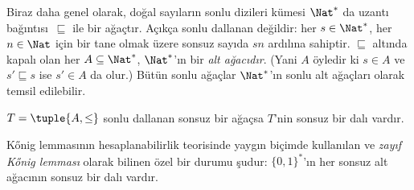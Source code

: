 \begin{ex}
Biraz daha genel olarak, doğal sayıların sonlu dizileri kümesi $\Nat^*$ da
uzantı bağıntısı~$\sqsubseteq$ ile bir ağaçtır. Açıkça sonlu dallanan değildir:
her $s \in \Nat^*$, her $n \in \Nat$ için bir tane olmak üzere sonsuz sayıda
$sn$ ardılına sahiptir. $\sqsubseteq$ altında kapalı olan her
$A \subseteq \Nat^*$, $\Nat^*$'ın bir \emph{alt ağacıdır}. (Yani $A$ öyledir
ki $s \in A$ ve $s' \sqsubseteq s$ ise $s' \in A$ da olur.) Bütün sonlu
ağaçlar $\Nat^*$'ın sonlu alt ağaçları olarak temsil edilebilir.
\end{ex}

\begin{prop}
$T=\tuple{A,\le}$ sonlu dallanan sonsuz bir ağaçsa $T$'nin sonsuz bir dalı
vardır.
\end{prop}

K\H{o}nig lemmasının hesaplanabilirlik teorisinde yaygın biçimde kullanılan ve
\emph{zayıf K\H{o}nig lemması} olarak bilinen özel bir durumu şudur:
$\{0,1\}^*$'ın her sonsuz alt ağacının sonsuz bir dalı vardır.

